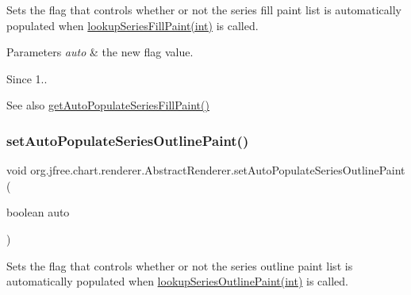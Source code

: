 Sets the flag that controls whether or not the series fill paint list is automatically populated when \mbox{\hyperlink{classorg_1_1jfree_1_1chart_1_1renderer_1_1_abstract_renderer_a12a702d7b43fac8d70b5c55c03b492fc}{lookup\+Series\+Fill\+Paint(int)}} is called.


\begin{DoxyParams}{Parameters}
{\em auto} & the new flag value.\\
\hline
\end{DoxyParams}
\begin{DoxySince}{Since}
1..
\end{DoxySince}
\begin{DoxySeeAlso}{See also}
\mbox{\hyperlink{classorg_1_1jfree_1_1chart_1_1renderer_1_1_abstract_renderer_a8f99b356760b4aab2603c011346359d1}{get\+Auto\+Populate\+Series\+Fill\+Paint()}} 
\end{DoxySeeAlso}
\mbox{\label{classorg_1_1jfree_1_1chart_1_1renderer_1_1_abstract_renderer_a8874e4c097e5fe9779d3476c55b17a99}} 
\subsubsection{\texorpdfstring{set\+Auto\+Populate\+Series\+Outline\+Paint()}{setAutoPopulateSeriesOutlinePaint()}}
{\footnotesize\ttfamily void org.\+jfree.\+chart.\+renderer.\+Abstract\+Renderer.\+set\+Auto\+Populate\+Series\+Outline\+Paint (\begin{DoxyParamCaption}\item[{boolean}]{auto }\end{DoxyParamCaption})}

Sets the flag that controls whether or not the series outline paint list is automatically populated when \mbox{\hyperlink{classorg_1_1jfree_1_1chart_1_1renderer_1_1_abstract_renderer_a1e691b145468f90219f5883f146664f5}{lookup\+Series\+Outline\+Paint(int)}} is called.


